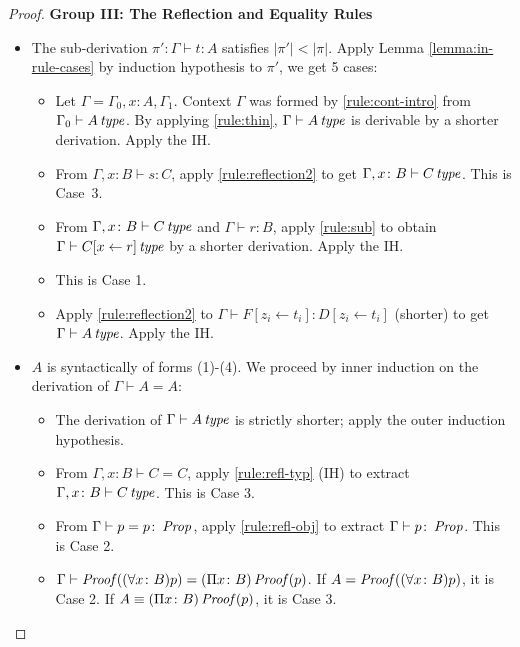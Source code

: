 \begin{proof}
    \noindent
    \textbf{Group III: The Reflection and Equality Rules}
    \begin{itemize}
        \item[\ref{rule:reflection2}] 
        The sub-derivation $\pi' \colon \Gamma \vdash t \colon A$ satisfies $|\pi'| < |\pi|$. Apply Lemma \ref{lemma:in-rule-cases} by induction hypothesis to $\pi'$, we get 5 cases:
        \begin{itemize}
            \item[Case 1] Let $\Gamma = \Gamma_0, x\colon A, \Gamma_1$. Context $\Gamma$ was formed by \ref{rule:cont-intro} from $\Gamma_0 \vdash A \operatorname{\mathit{\space type}}$. By applying \ref{rule:thin}, $\Gamma \vdash A \operatorname{\mathit{\space type}}$ is derivable by a shorter derivation. Apply the IH.
            \item[Case 2] From $\Gamma,x\colon B \vdash s\colon C$, apply \ref{rule:reflection2} to get $\Gamma,x\colon B \vdash C \operatorname{\mathit{\space type}}$. This is Case~3.
            \item[Case 3] From $\Gamma,x\colon B \vdash C \operatorname{\mathit{\space type}}$ and $\Gamma \vdash r\colon B$, apply \ref{rule:sub} to obtain $\Gamma \vdash C[x\leftarrow r] \operatorname{\mathit{\space type}}$ by a shorter derivation. Apply the IH.
            \item[Case 4] This is Case 1.
            \item[Case 5] Apply \ref{rule:reflection2} to $\Gamma \vdash F[z_i\leftarrow t_i] \colon D[z_i\leftarrow t_i]$ (shorter) to get $\Gamma \vdash A \operatorname{\mathit{\space type}}$. Apply the IH.
        \end{itemize}

        \item [\ref{rule:refl-typ}]
        $A$ is syntactically of forms (1)-(4). We proceed by inner induction on the derivation of $\Gamma \vdash A = A$:
        \begin{itemize}
            \item[\ref{rule:refl-typ}] The derivation of $\Gamma \vdash A \operatorname{\mathit{\space type}}$ is strictly shorter; apply the outer induction hypothesis.
            \item[\ref{rule:prod-equ}] From $\Gamma,x\colon B \vdash C = C$, apply \ref{rule:refl-typ} (IH) to extract $\Gamma,x\colon B \vdash C \operatorname{\mathit{\space type}}$. This is Case 3.
            \item[\ref{rule:prop-equ}] From $\Gamma \vdash p = p \colon \operatorname{\mathit{Prop}}$, apply \ref{rule:refl-obj} to extract $\Gamma \vdash p \colon \operatorname{\mathit{Prop}}$. This is Case 2.
            \item[\ref{rule:forall-elim}] $\Gamma \vdash \operatorname{\mathit{Proof}}((\forall x\colon B)p) = (\Pi x\colon B)\operatorname{\mathit{Proof}}(p)$. If $A = \operatorname{\mathit{Proof}}((\forall x\colon B)p)$, it is Case 2. If $A \equiv (\Pi x\colon B)\operatorname{\mathit{Proof}}(p)$, it is Case 3. \qedhere
        \end{itemize}
    \end{itemize}
\end{proof}

